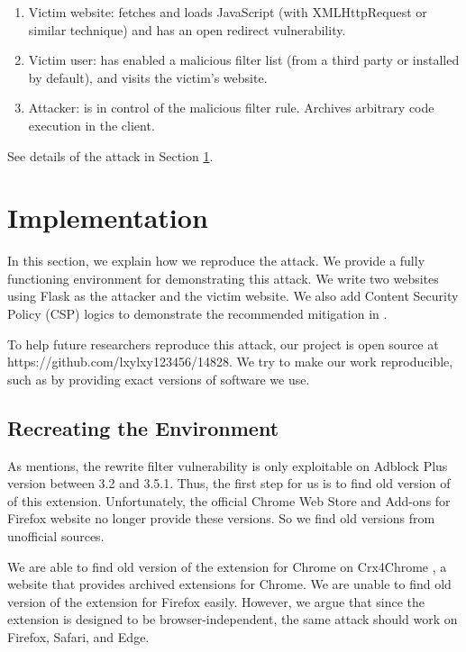 \documentclass[conference]{IEEEtran}
\begin{document}
\begin{enumerate}
    \item Victim website: fetches and loads JavaScript (with XMLHttpRequest or similar technique) and has an open redirect vulnerability.
    \item Victim user: has enabled a malicious filter list (from a third party or installed by default), and visits the victim's website.
    \item Attacker: is in control of the malicious filter rule. Archives arbitrary code execution in the client.
\end{enumerate}

See details of the attack in Section \ref{sec:Implementation}.

\section{Implementation}
\label{sec:Implementation}

In this section, we explain how we reproduce the attack. We provide a fully functioning environment for demonstrating this attack. We write two websites using Flask as the attacker and the victim website. We also add Content Security Policy (CSP) logics to demonstrate the recommended mitigation in \cite{abp_code_injection}.

To help future researchers reproduce this attack, our project is open source at https://github.com/lxylxy123456/14828. We try to make our work reproducible, such as by providing exact versions of software we use.

\subsection{Recreating the Environment}

As \cite{abp_code_injection} mentions, the rewrite filter vulnerability is only exploitable on Adblock Plus version between 3.2 and 3.5.1. Thus, the first step for us is to find old version of of this extension. Unfortunately, the official Chrome Web Store and Add-ons for Firefox website no longer provide these versions. So we find old versions from unofficial sources.

We are able to find old version of the extension for Chrome on Crx4Chrome \cite{cr4chrome_abp}, a website that provides archived extensions for Chrome. We are unable to find old version of the extension for Firefox easily. However, we argue that since the extension is designed to be browser-independent, the same attack should work on Firefox, Safari, and Edge.
\end{document}
